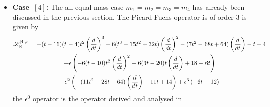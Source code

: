 \documentclass[a4paper,12pt]{article}
\numberwithin{equation}{section}
\numberwithin{figure}{section}
\def\su{\circleddash}
\begin{document}
\begin{itemize}
\item  {\bf Case~$[4]$:} The all equal mass case $m_1=m_2=m_3=m_4$ has already been
  discussed in the previous section. The Picard-Fuchs operator is of order 3 is given by
  \begin{multline}
    \mathscr{L}_\su^{[4],\epsilon}=
    -(t - 16)  (t - 4)  t^2\left(d\over dt\right)^3 - 6  (t^3 -
                              15  t^2 + 32  t)  \left(d\over dt\right)^2 - (7  t^2 - 68  t +
                              64)  \left(d\over dt\right) - t + 4\cr
                              +\epsilon \left(-6  (t - 10  ) t^2 \left(d\over dt\right)^2 -
      6  (3  t - 20  ) t \left(d\over dt\right) +18- 6  t 
      \right)\cr
    +\epsilon^2\left(-(11  t^2 -
      28  t - 64)  \left(d\over dt\right) - 11  t + 14\right)+ \epsilon^3\left(-6  t - 12\right)
  \end{multline}
the $\epsilon^0$ operator is the operator derived and analysed in~\cite{Vanhove:2014wqa,Bloch:2014qca,Pogel:2022yat}



\end{itemize}
\end{document}
